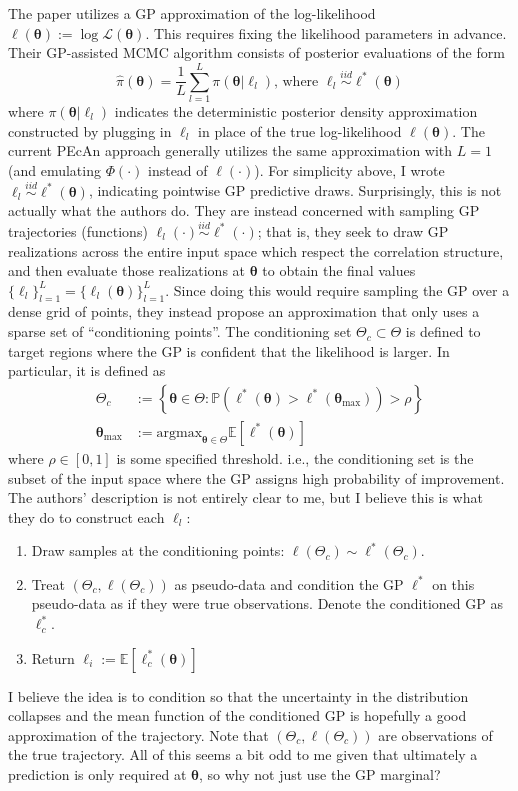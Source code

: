 \documentclass[12pt]{article}
\newcommand{\E}{\mathbb{E}}
\newcommand{\Prob}{\mathbb{P}}
\newcommand{\btheta}{\boldsymbol{\theta}}
\begin{document}
 The paper \cite{LEBEL2019158} utilizes a GP approximation of the log-likelihood 
 $\ell(\btheta) := \log \mathcal{L}(\btheta)$. This requires fixing the likelihood parameters in advance. Their GP-assisted MCMC algorithm consists of posterior evaluations of the form 
 \[\hat{\pi}(\btheta) = \frac{1}{L} \sum_{l = 1}^{L} \pi(\btheta|\ell_l) \text{, where } \ell_l \overset{iid}{\sim} \ell^*(\btheta)\]
 where $\pi(\btheta|\ell_l)$ indicates the deterministic posterior density approximation constructed by plugging in $\ell_l$ in place of the true log-likelihood $\ell(\btheta)$. 
 The current PEcAn approach generally utilizes the same approximation with $L = 1$ (and emulating $\Phi(\cdot)$ instead of $\ell(\cdot)$). For simplicity above, I wrote 
 $\ell_l \overset{iid}{\sim} \ell^*(\btheta)$, indicating pointwise GP predictive draws. Surprisingly, this is not actually what the authors do. They are 
 instead concerned with sampling GP trajectories (functions) $\ell_l(\cdot) \overset{iid}{\sim} \ell^*(\cdot)$; that is, they seek to draw GP realizations across the entire input space 
 which respect the correlation structure, and then evaluate those realizations at $\btheta$ to obtain the final values $\{\ell_l\}_{l = 1}^{L} = \{\ell_l(\btheta)\}_{l = 1}^{L}$. Since doing this 
 would require sampling the GP over a dense grid of points, they instead propose an approximation that only uses a sparse set of ``conditioning points''. The conditioning 
 set $\Theta_c \subset \Theta$ is defined to target regions where the GP is confident that the likelihood is larger. In particular, it is defined as 
 \begin{align*}
\Theta_c &:= \left\{\btheta \in \Theta : \Prob\left(\ell^*(\btheta) > \ell^*(\btheta_{\text{max}}) \right) > \rho \right\} \\
\btheta_{\text{max}} &:= \text{argmax}_{\btheta \in \Theta} \E\left[\ell^*(\btheta)\right]
 \end{align*}
 where $\rho \in [0, 1]$ is some specified threshold. i.e., the conditioning set is the subset of the input space where the GP assigns high probability of improvement. The authors' description is 
 not entirely clear to me, but I believe this is what they do to construct each $\ell_l$: 
 \begin{enumerate}
 \item Draw samples at the conditioning points: $\ell(\Theta_c) \sim \ell^*(\Theta_c)$. 
 \item Treat $\left(\Theta_c, \ell(\Theta_c)\right)$ as pseudo-data and condition the GP $\ell^*$ on this pseudo-data as if they were true observations. Denote the conditioned GP as $\ell^*_c$. 
 \item Return $\ell_i := \E\left[\ell_c^*(\btheta) \right]$
 \end{enumerate}
 I believe the idea is to condition so that the uncertainty in the distribution collapses and the mean function of the conditioned GP is hopefully a good approximation of the trajectory. Note that 
 $\left(\Theta_c, \ell(\Theta_c)\right)$ are observations of the true trajectory. All of this seems a bit odd to me given that ultimately a prediction is only required at $\btheta$, so why not just 
 use the GP marginal?  
 
\end{document}
